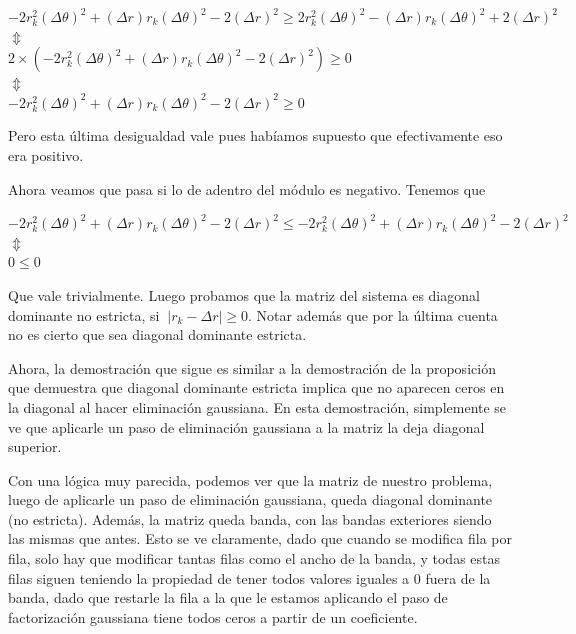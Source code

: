 \begin{center}
$-2 r_k^2 (\Delta \theta)^2 + (\Delta r) r_k (\Delta \theta)^2 - 2 (\Delta r)^2 \geq
2 r_k^2 (\Delta \theta)^2 - (\Delta r) r_k (\Delta \theta)^2 + 2 (\Delta r)^2$ \\
$\Updownarrow$\\
$2\times (-2 r_k^2 (\Delta \theta)^2 + (\Delta r) r_k (\Delta \theta)^2 - 2 (\Delta r)^2) \geq 0$\\
$\Updownarrow$\\
$-2 r_k^2 (\Delta \theta)^2 + (\Delta r) r_k (\Delta \theta)^2 - 2 (\Delta r)^2 \geq 0$
\end{center}

Pero esta última desigualdad vale pues habíamos supuesto que efectivamente eso era positivo.

Ahora veamos que pasa si lo de adentro del módulo es negativo. Tenemos que 

\begin{center}
$-2 r_k^2 (\Delta \theta)^2 + (\Delta r) r_k (\Delta \theta)^2 - 2 (\Delta r)^2 \leq
-2 r_k^2 (\Delta \theta)^2 + (\Delta r) r_k (\Delta \theta)^2 - 2 (\Delta r)^2$ \\
$\Updownarrow$\\
$0 \leq 0$\\
\end{center}

Que vale trivialmente. Luego probamos que la matriz del sistema es diagonal dominante no estricta, si $~{\left\vert r_k - \Delta r \right\vert \geq 0}$. Notar además que por la última cuenta no es cierto que sea diagonal dominante estricta.


Ahora, la demostración que sigue es similar a la demostración de la proposición que demuestra que diagonal dominante estricta implica que no aparecen ceros en la diagonal al hacer eliminación gaussiana. En esta demostración, simplemente se ve que aplicarle un paso de eliminación gaussiana a la matriz la deja diagonal superior.

Con una lógica muy parecida, podemos ver que la matriz de nuestro problema, luego de aplicarle un paso de eliminación gaussiana, queda diagonal dominante (no estricta). Además, la matriz queda banda, con las bandas exteriores siendo las mismas que antes. Esto se ve claramente, dado que cuando se modifica fila por fila, solo hay que modificar tantas filas como el ancho de la banda, y todas estas filas siguen teniendo la propiedad de tener todos valores iguales a 0 fuera de la banda,
dado que restarle la fila a la que le estamos aplicando el paso de factorización gaussiana tiene todos ceros a partir de un coeficiente.

